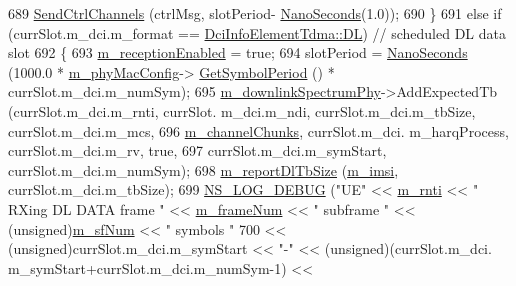 \begin{DoxyCode}
689                 \hyperlink{classns3_1_1MmWaveUePhy_a14158d6bc5c762fdb0841966f9dfa8cf}{SendCtrlChannels} (ctrlMsg, slotPeriod-
      \hyperlink{group__timecivil_ga281d64bcb4dad96267d83c7688ec433f}{NanoSeconds}(1.0));
690         \}
691         \textcolor{keywordflow}{else} \textcolor{keywordflow}{if} (currSlot.m\_dci.m\_format == \hyperlink{structns3_1_1DciInfoElementTdma_af998ccd3b1e03836c113d353facc76f4a6497273a219b44fa44ea3a6ea608bfcb}{DciInfoElementTdma::DL})  \textcolor{comment}{// scheduled DL
       data slot}
692         \{
693                 \hyperlink{classns3_1_1MmWaveUePhy_a3ce209682bac7903e014ea63df3cf0f5}{m\_receptionEnabled} = \textcolor{keyword}{true};
694                 slotPeriod = \hyperlink{group__timecivil_ga281d64bcb4dad96267d83c7688ec433f}{NanoSeconds} (1000.0 * \hyperlink{classns3_1_1MmWavePhy_a869abf36bbdbb94eed77ba6e4846f6e4}{m\_phyMacConfig}->
      \hyperlink{classns3_1_1MmWavePhyMacCommon_a1048fa4a24a72abc5d4d982efd6c21af}{GetSymbolPeriod} () * currSlot.m\_dci.m\_numSym);
695                 \hyperlink{classns3_1_1MmWavePhy_aa266d9d20ba903f9adf2695dd626b885}{m\_downlinkSpectrumPhy}->AddExpectedTb (currSlot.m\_dci.m\_rnti, currSlot.
      m\_dci.m\_ndi, currSlot.m\_dci.m\_tbSize, currSlot.m\_dci.m\_mcs,
696                                                       \hyperlink{classns3_1_1MmWaveUePhy_aa41c90d5e37b7b4f65a4bad8b6e4295f}{m\_channelChunks}, currSlot.m\_dci.
      m\_harqProcess, currSlot.m\_dci.m\_rv, \textcolor{keyword}{true},
697                                                       currSlot.m\_dci.m\_symStart, currSlot.m\_dci.m\_numSym);
698                 \hyperlink{classns3_1_1MmWaveUePhy_aa64fc9fd78f026c8792d91b12c6b40d7}{m\_reportDlTbSize} (\hyperlink{classns3_1_1MmWaveUePhy_ae1bada3d54462b51bc01803e56f449ee}{m\_imsi}, currSlot.m\_dci.m\_tbSize);
699                 \hyperlink{group__logging_ga413f1886406d49f59a6a0a89b77b4d0a}{NS\_LOG\_DEBUG} (\textcolor{stringliteral}{"UE"} << \hyperlink{classns3_1_1MmWaveUePhy_aae63c66b69de47ac19b4033ecf4bc211}{m\_rnti} << \textcolor{stringliteral}{" RXing DL DATA frame "} << 
      \hyperlink{classns3_1_1MmWavePhy_a852ce585035a1c12122d2775e64ff38a}{m\_frameNum} << \textcolor{stringliteral}{" subframe "} << (\textcolor{keywordtype}{unsigned})\hyperlink{classns3_1_1MmWavePhy_af3d76eb9f3e5e1ff669852d05986c1a3}{m\_sfNum} << \textcolor{stringliteral}{" symbols "}
700                               << (\textcolor{keywordtype}{unsigned})currSlot.m\_dci.m\_symStart << \textcolor{stringliteral}{"-"} << (\textcolor{keywordtype}{unsigned})(currSlot.m\_dci.
      m\_symStart+currSlot.m\_dci.m\_numSym-1) <<

\end{DoxyCode}
